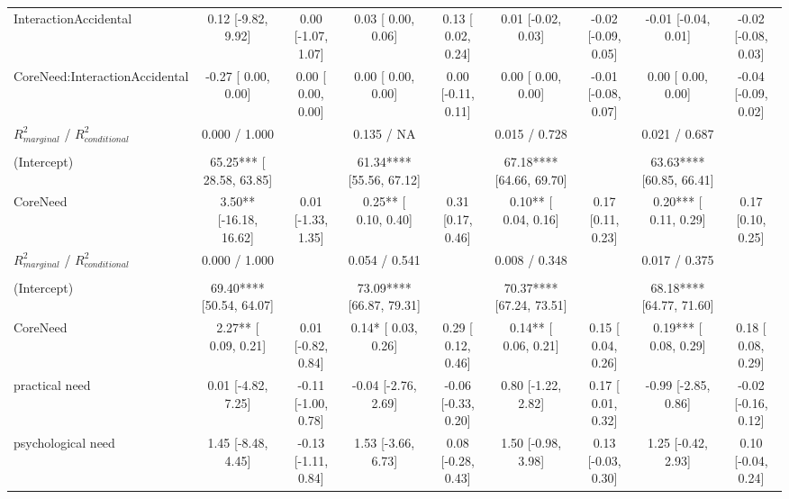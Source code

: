 \begin{table}
\begin{minipage}[t][\textheight][t]{\textwidth}
{\begin{tabular}[t]{lcccccccc}
\hspace{1em}InteractionAccidental & 0.12 [-9.82,  9.92] & 0.00 [-1.07, 1.07] & 0.03 [ 0.00,  0.06] & 0.13 [ 0.02, 0.24] & 0.01 [-0.02,  0.03] & -0.02 [-0.09, 0.05] & -0.01 [-0.04,  0.01] & -0.02 [-0.08, 0.03]\\
\hspace{1em}CoreNeed:InteractionAccidental & -0.27 [ 0.00,  0.00] & 0.00 [ 0.00, 0.00] & 0.00 [ 0.00,  0.00] & 0.00 [-0.11, 0.11] & 0.00 [ 0.00,  0.00] & -0.01 [-0.08, 0.07] & 0.00 [ 0.00,  0.00] & -0.04 [-0.09, 0.02]\\
\hspace{1em}$R^2_{marginal}$ / $R^2_{conditional}$ & 0.000 / 1.000 &  & 0.135 / NA &  & 0.015 / 0.728 &  & 0.021 / 0.687 & \\
\addlinespace[0.3em]
\multicolumn{9}{l}{\textbf{Well-being Outcome}}\\
\hspace{1em}(Intercept) & 65.25*** [ 28.58, 63.85] &  & 61.34**** [55.56, 67.12] &  & 67.18**** [64.66, 69.70] &  & 63.63**** [60.85, 66.41] & \\
\hspace{1em}CoreNeed & 3.50** [-16.18, 16.62] & 0.01 [-1.33, 1.35] & 0.25** [ 0.10,  0.40] & 0.31 [0.17, 0.46] & 0.10** [ 0.04,  0.16] & 0.17 [0.11, 0.23] & 0.20*** [ 0.11,  0.29] & 0.17 [0.10, 0.25]\\
\hspace{1em}$R^2_{marginal}$ / $R^2_{conditional}$ & 0.000 / 1.000 &  & 0.054 / 0.541 &  & 0.008 / 0.348 &  & 0.017 / 0.375 & \\
\addlinespace[0.3em]
\multicolumn{9}{l}{\textbf{Need Type}}\\
\hspace{1em}(Intercept) & 69.40**** [50.54, 64.07] &  & 73.09**** [66.87, 79.31] &  & 70.37**** [67.24, 73.51] &  & 68.18**** [64.77, 71.60] & \\
\hspace{1em}CoreNeed & 2.27** [ 0.09,  0.21] & 0.01 [-0.82, 0.84] & 0.14* [ 0.03,  0.26] & 0.29 [ 0.12, 0.46] & 0.14** [ 0.06,  0.21] & 0.15 [ 0.04, 0.26] & 0.19*** [ 0.08,  0.29] & 0.18 [ 0.08, 0.29]\\
\hspace{1em}practical need & 0.01 [-4.82,  7.25] & -0.11 [-1.00, 0.78] & -0.04 [-2.76,  2.69] & -0.06 [-0.33, 0.20] & 0.80 [-1.22,  2.82] & 0.17 [ 0.01, 0.32] & -0.99 [-2.85,  0.86] & -0.02 [-0.16, 0.12]\\
\hspace{1em}psychological need & 1.45 [-8.48,  4.45] & -0.13 [-1.11, 0.84] & 1.53 [-3.66,  6.73] & 0.08 [-0.28, 0.43] & 1.50 [-0.98,  3.98] & 0.13 [-0.03, 0.30] & 1.25 [-0.42,  2.93] & 0.10 [-0.04, 0.24]\\

\end{tabular}}
\end{minipage}
\end{table}
